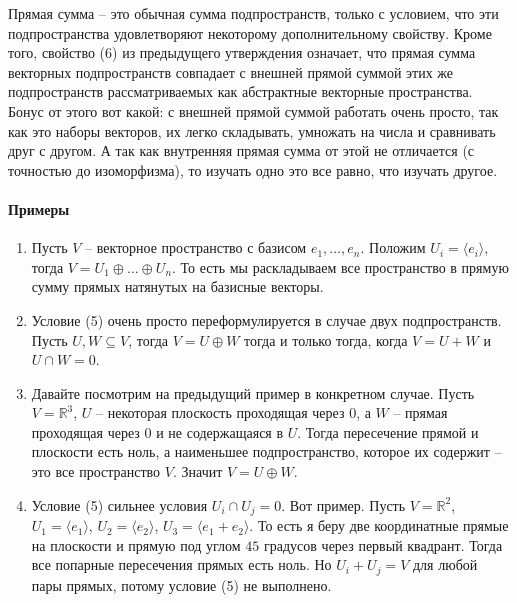 Прямая сумма -- это обычная сумма подпространств, только с условием, что эти подпространства удовлетворяют некоторому дополнительному свойству.
Кроме того, свойство (6) из предыдущего утверждения означает, что прямая сумма векторных подпространств совпадает с внешней прямой суммой этих же подпространств рассматриваемых как абстрактные векторные пространства.
Бонус от этого вот какой: с внешней прямой суммой работать очень просто, так как это наборы векторов, их легко складывать, умножать на числа и сравнивать друг с другом.
А так как внутренняя прямая сумма от этой не отличается (с точностью до изоморфизма), то изучать одно это все равно, что изучать другое.


\paragraph{Примеры}

\begin{enumerate}
\item Пусть $V$ -- векторное пространство с базисом $e_1,\ldots,e_n$.
Положим $U_i = \langle e_i \rangle$, тогда $V = U_1 \oplus \ldots \oplus U_n$.
То есть мы раскладываем все пространство в прямую сумму прямых натянутых на базисные векторы.

\item Условие (5) очень просто переформулируется в случае двух подпространств.
Пусть $U, W\subseteq V$, тогда $V = U \oplus W$ тогда и только тогда, когда $V = U + W$ и $U \cap W = 0$.

\item Давайте посмотрим на предыдущий пример в конкретном случае.
Пусть $V=\mathbb R^3$, $U$ -- некоторая плоскость проходящая через $0$, а $W$ -- прямая проходящая через $0$ и не содержащаяся в $U$.
Тогда пересечение прямой и плоскости есть ноль, а наименьшее подпространство, которое их содержит -- это все пространство $V$.
Значит $V = U \oplus W$.

\item Условие (5) сильнее условия $U_i \cap U_j = 0$.
Вот пример.
Пусть $V = \mathbb R^2$, $U_1 = \langle e_1\rangle$, $U_2 = \langle e_2\rangle$, $U_3 = \langle e_1 + e_2\rangle$.
То есть я беру две координатные прямые на плоскости и прямую под углом $45$ градусов через первый квадрант.
Тогда все попарные пересечения прямых есть ноль.
Но $U_i + U_j = V$ для любой пары прямых, потому условие (5) не выполнено.
\end{enumerate}
